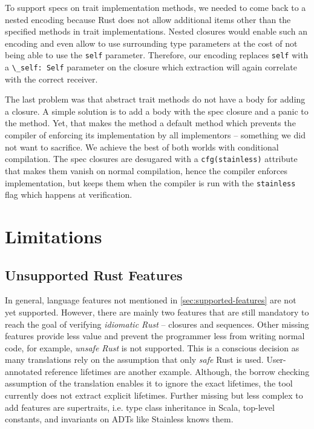 To support specs on trait implementation methods, we needed to come back
to a nested encoding because Rust does not allow additional items other
than the specified methods in trait implementations. Nested closures
would enable such an encoding and even allow to use surrounding type
parameters at the cost of not being able to use the
\passthrough{\lstinline!self!} parameter. Therefore, our encoding
replaces \passthrough{\lstinline!self!} with a
\passthrough{\lstinline!\_self: Self!} parameter on the closure which
extraction will again correlate with the correct receiver.

The last problem was that abstract trait methods do not have a body for
adding a closure. A simple solution is to add a body with the spec
closure and a panic to the method. Yet, that makes the method a default
method which prevents the compiler of enforcing its implementation by
all implementors -- something we did not want to sacrifice. We achieve
the best of both worlds with conditional compilation. The spec closures
are desugared with a \passthrough{\lstinline!cfg(stainless)!} attribute
that makes them vanish on normal compilation, hence the compiler
enforces implementation, but keeps them when the compiler is run with
the \passthrough{\lstinline!stainless!} flag which happens at
verification.



\section{Limitations}
\label{impl-limitations}

\subsection{Unsupported Rust Features}

In general, language features not mentioned in \autoref{sec:supported-features}
are not yet supported. However, there are mainly two features that are still
mandatory to reach the goal of verifying \emph{idiomatic Rust} -- closures and
sequences.  Other missing features provide less value and prevent the programmer
less from writing normal code, for example, \emph{unsafe Rust} is not supported.
This is a conscious decision as many translations rely on the assumption that
only \emph{safe} Rust is used. User-annotated reference lifetimes are another
example. Although, the borrow checking assumption of the translation enables it
to ignore the exact lifetimes, the tool currently does not extract explicit
lifetimes. Further missing but less complex to add features are supertraits,
i.e. type class inheritance in Scala, top-level constants, and invariants on
ADTs like Stainless knows them.


